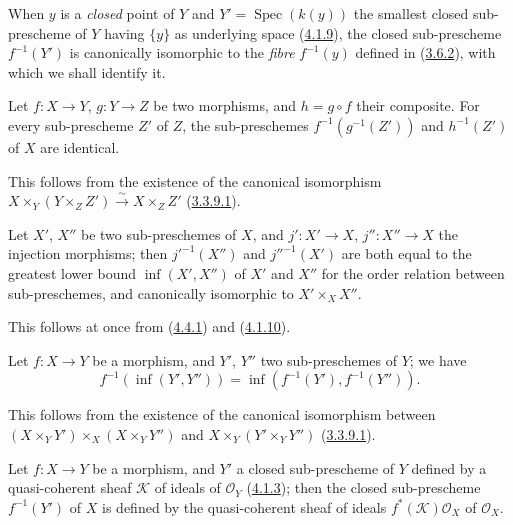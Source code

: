 When $y$ is a \emph{closed} point of $Y$ and
$Y'=\operatorname{Spec}(k(y))$ the smallest closed sub-prescheme of $Y$ having
$\{y\}$ as underlying space (\hyperref[I.4.1.9]{4.1.9}), the
closed sub-prescheme $f^{-1}(Y')$ is canonically isomorphic to the
\emph{fibre} $f^{-1}(y)$ defined in (\hyperref[I.3.6.2]{3.6.2}), with
which we shall identify it.

\begin{corollary}[4.4.2]
\label{I.4.4.2}
Let $f:X\to Y$, $g:Y\to Z$ be two morphisms, and $h=g\circ f$ their
composite. For every sub-prescheme $Z'$ of $Z$, the sub-preschemes
$f^{-1}(g^{-1}(Z'))$ and $h^{-1}(Z')$ of $X$ are identical.
\end{corollary}

This follows from the existence of the canonical isomorphism
$X\times_Y(Y\times_Z Z')\xrightarrow{\sim}X\times_Z Z'$
(\hyperref[I.3.3.9.1]{3.3.9.1}).

\begin{corollary}[4.4.3]
\label{I.4.4.3}
Let $X'$, $X''$ be two sub-preschemes of $X$, and $j':X'\to X$,
$j'':X''\to X$ the injection morphisms; then ${j'}^{-1}(X'')$ and
${j''}^{-1}(X')$ are both equal to the greatest lower bound
$\inf(X',X'')$ of $X'$ and $X''$ for the order relation between
sub-preschemes, and canonically isomorphic to $X'\times_X X''$.
\end{corollary}

This follows at once from (\hyperref[I.4.4.1]{4.4.1}) and
(\hyperref[I.4.1.10]{4.1.10}).

\begin{corollary}[4.4.4]
\label{I.4.4.4}
Let $f:X\to Y$ be a morphism, and $Y'$, $Y''$ two sub-preschemes of $Y$;
we have
\[
  f^{-1}(\inf(Y',Y''))=\inf(f^{-1}(Y'),f^{-1}(Y'')).
\]
\end{corollary}

This follows from the existence of the canonical isomorphism between
$(X\times_Y Y')\times_X(X\times_Y Y'')$ and
$X\times_Y(Y'\times_Y Y'')$ (\hyperref[I.3.3.9.1]{3.3.9.1}).

\begin{proposition}[4.4.5]
\label{I.4.4.5}
Let $f:X\to Y$ be a morphism, and $Y'$ a closed sub-prescheme of $Y$ defined
by a quasi-coherent sheaf $\mathscr{K}$ of ideals of $\mathscr{O}_Y$
(\hyperref[I.4.1.3]{4.1.3}); then the closed sub-prescheme $f^{-1}(Y')$ of
$X$ is defined by the quasi-coherent sheaf of ideals
$f^*(\mathscr{K})\mathscr{O}_X$ of $\mathscr{O}_X$.
\end{proposition}

